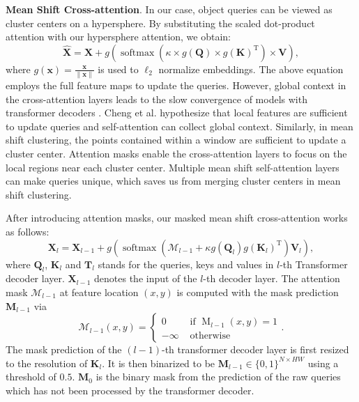 \documentclass[letterpaper, 10 pt, conference]{ieeeconf}
\begin{document}
\textbf{Mean Shift Cross-attention}. In our case, object queries can be viewed as cluster centers on a hypersphere. By substituting the scaled dot-product attention with our hypersphere attention, we obtain:
\begin{equation} \label{mscross}
    \hat{\mathbf{X}}=\mathbf{X}+g(\operatorname{softmax}\left(\kappa \times g(\mathbf{Q}) \times g(\mathbf{K})^{\mathrm{T}}\right) \times \mathbf{V}),
\end{equation}
where $g(\mathbf{x})=\frac{\mathbf{x}}{\lVert \mathbf{x} \rVert}$ is used to $\ell_2$ normalize embeddings. The above equation employs the full feature maps to update the queries. However, global context in the cross-attention layers leads to the slow convergence of models with transformer decoders \cite{gao2021fast, sun2021rethinking}. Cheng et al. \cite{cheng2022masked} hypothesize that local features are sufficient to update queries and self-attention can collect global context. Similarly, in mean shift clustering, the points contained within a window are sufficient to update a cluster center. Attention masks enable the cross-attention layers to focus on the local regions near each cluster center. Multiple mean shift self-attention layers can make queries unique, which saves us from merging cluster centers in mean shift clustering.


After introducing attention masks, our masked mean shift cross-attention works as follows:
\begin{equation}
    \mathbf{X}_l=\mathbf{X}_{l-1} + g(\operatorname{softmax}\left(\mathcal{M}_{l-1}+\kappa g(\mathbf{Q}_l) g(\mathbf{K}_l)^{\mathrm{T}}\right) \mathbf{V}_l),
\end{equation}
where $\mathbf{Q}_l$, $\mathbf{K}_l$ and $\mathbf{T}_l$ stands for the queries, keys and values in $l$-th Transformer decoder layer. $\mathbf{X}_{l-1}$ denotes the input of the $l$-th decoder layer. The attention mask $\mathcal{M}_{l-1}$ \cite{cheng2022masked} at feature location $(x, y)$ is computed with the mask prediction $\mathbf{M}_{l-1}$ via
\vspace{-2mm}
\begin{equation} \label{attMask}
    \mathcal{M}_{l-1}(x, y)=\left\{\begin{array}{ll}
0 & \text { if } \operatorname{M}_{l-1}(x, y)=1 \\
-\infty & \text { otherwise }
\end{array} .\right.
\end{equation}
The mask prediction of the $(l-1)$-th transformer decoder layer is first resized to the resolution of $\mathbf{K}_l$. It is then binarized to be $\mathbf{M}_{l-1} \in\{0,1\}^{N \times H W}$ using a threshold of $0.5$. $\mathbf{M}_0$ is the binary mask from the prediction of the raw queries which has not been processed by the transformer decoder.
\vspace{-2mm}
\end{document}
